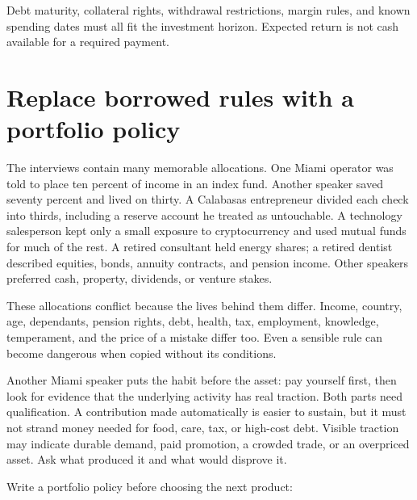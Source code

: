 Debt maturity, collateral rights, withdrawal restrictions, margin rules, and
known spending dates must all fit the investment horizon. Expected return is
not cash available for a required payment.

\section{Replace borrowed rules with a portfolio policy}

The interviews contain many memorable allocations. One Miami operator was
told to place ten percent of income in an index fund. Another speaker saved
seventy percent and lived on thirty. A Calabasas entrepreneur divided each
check into thirds, including a reserve account he treated as untouchable. A
technology salesperson kept only a small exposure to cryptocurrency and used
mutual funds for much of the rest. A retired consultant held energy shares; a
retired dentist described equities, bonds, annuity contracts, and pension
income. Other speakers preferred cash, property, dividends, or venture stakes.

These allocations conflict because the lives behind them differ. Income,
country, age, dependants, pension rights, debt, health, tax, employment,
knowledge, temperament, and the price of a mistake differ too. Even a sensible
rule can become dangerous when copied without its conditions.

Another Miami speaker puts the habit before the asset: pay yourself first, then
look for evidence that the underlying activity has real traction. Both parts
need qualification. A contribution made automatically is easier to sustain, but
it must not strand money needed for food, care, tax, or high-cost debt. Visible
traction may indicate durable demand, paid promotion, a crowded trade, or an
overpriced asset. Ask what produced it and what would disprove it.

Write a portfolio policy before choosing the next product:


